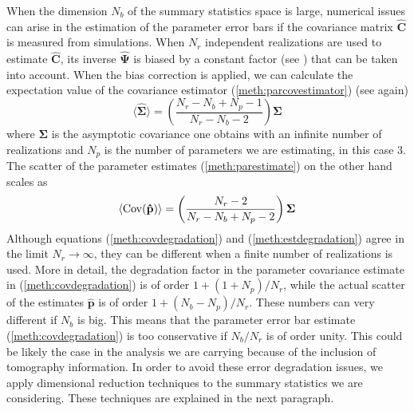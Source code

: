 \documentclass[reprint,aps,prd,superscriptaddress,showkeys,showpacs]{revtex4-1}
\newcommand{\bb}[1]{\mathbf{#1}}
\newcommand{\bbh}[1]{\mathbf{\hat{#1}}}
\begin{document}
When the dimension $N_b$ of the summary statistics space is large, numerical issues can arise in the estimation of the parameter error bars if the covariance matrix $\bbh{C}$ is measured from simulations. When $N_r$ independent realizations are used to estimate $\bbh{C}$, its inverse $\bbh{\Psi}$ is biased by a constant factor (see \citep{Hartlap07,Taylor12,Taylor14}) that can be taken into account. When the bias correction is applied, we can calculate the expectation value of the covariance estimator (\ref{meth:parcovestimator}) (see again\citep{Taylor14})
\begin{equation}
\label{meth:covdegradation}
\langle\bbh{\Sigma}\rangle = \left(\frac{N_r-N_b+N_p-1}{N_r-N_b-2}\right)\bb{\Sigma}
\end{equation}   
%
where $\bb{\Sigma}$ is the asymptotic covariance one obtains with an infinite number of realizations and $N_p$ is the number of parameters we are estimating, in this case 3. The scatter of the parameter estimates (\ref{meth:parestimate}) on the other hand scales as 
\begin{equation}
\label{meth:estdegradation}
\langle{\rm Cov}(\bbh{p})\rangle = \left(\frac{N_r-2}{N_r-N_b+N_p-2}\right)\bb{\Sigma}
\end{equation}
%
Although equations (\ref{meth:covdegradation}) and (\ref{meth:estdegradation}) agree in the limit $N_r\rightarrow\infty$, they can be different when a finite number of realizations is used. More in detail, the degradation factor in the parameter covariance estimate in (\ref{meth:covdegradation}) is of order $1+(1+N_p)/N_r$, while the actual scatter of the estimates $\bbh{p}$ is of order $1+(N_b-N_p)/N_r$. These numbers can very different if $N_b$ is big. This means that the parameter error bar estimate (\ref{meth:covdegradation}) is too conservative if $N_b/N_r$ is of order unity. This could be likely the case in the analysis we are carrying because of the inclusion of tomography information. In order to avoid these error degradation issues, we apply dimensional reduction techniques to the summary statistics we are considering. These techniques are explained in the next paragraph.   


\end{document}

